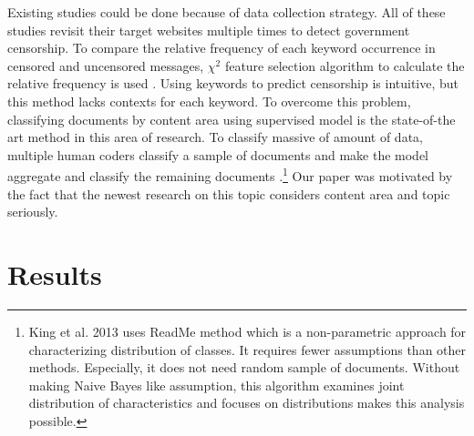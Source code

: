 \documentclass{sig-alternate-05-2015}
\begin{document}
Existing studies could be done because of data collection strategy. All of these studies revisit their target websites multiple times to detect government censorship. To compare the relative frequency of each keyword occurrence in censored and uncensored messages, $\chi^2$ feature selection algorithm to calculate the relative frequency is used \cite{Fu2013a}. Using keywords to predict censorship is intuitive, but this method lacks contexts for each keyword. To overcome this problem, classifying documents by content area using supervised model is the state-of-the art method in this area of research. To classify massive of amount of data, multiple human coders classify a sample of documents and make the model aggregate and classify the remaining documents \cite{king2013censorship}.\footnote{King et al. 2013 \cite{king2013censorship} uses ReadMe \cite{hopkins2010method} method which is a non-parametric approach for characterizing distribution of classes. It requires fewer assumptions than other methods. Especially, it does not need random sample of documents. Without making Naive Bayes like assumption, this algorithm examines joint distribution of characteristics  and focuses on distributions makes this analysis possible.} Our paper was motivated by the fact that the newest research on this topic considers content area and topic seriously.


\section{Results}



\end{document}
